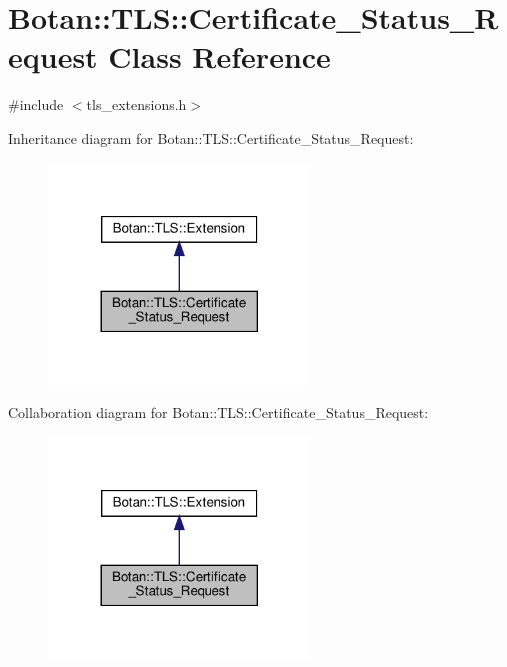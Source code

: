 \hypertarget{class_botan_1_1_t_l_s_1_1_certificate___status___request}{}\section{Botan\+:\+:T\+LS\+:\+:Certificate\+\_\+\+Status\+\_\+\+Request Class Reference}
\label{class_botan_1_1_t_l_s_1_1_certificate___status___request}


{\ttfamily \#include $<$tls\+\_\+extensions.\+h$>$}



Inheritance diagram for Botan\+:\+:T\+LS\+:\+:Certificate\+\_\+\+Status\+\_\+\+Request\+:
\nopagebreak
\begin{figure}[H]
\begin{center}
\leavevmode
\includegraphics[width=197pt]{class_botan_1_1_t_l_s_1_1_certificate___status___request__inherit__graph}
\end{center}
\end{figure}


Collaboration diagram for Botan\+:\+:T\+LS\+:\+:Certificate\+\_\+\+Status\+\_\+\+Request\+:
\nopagebreak
\begin{figure}[H]
\begin{center}
\leavevmode
\includegraphics[width=197pt]{class_botan_1_1_t_l_s_1_1_certificate___status___request__coll__graph}
\end{center}
\end{figure}
